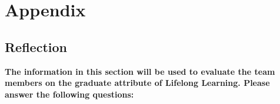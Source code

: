 \documentclass[12pt, titlepage]{article}
\begin{document}
\newpage





\newpage

\section{Appendix}






\subsection{Reflection}

\textbf{The information in this section will be used to evaluate the team members on the graduate attribute
	of Lifelong Learning. Please answer the following questions:}
\end{document}
